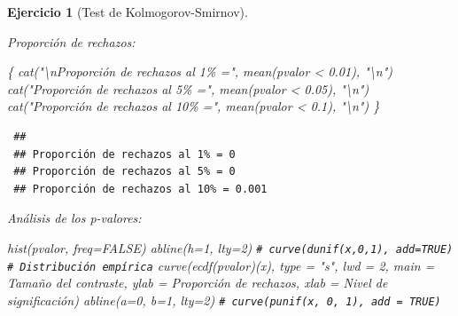 \documentclass[
]{book}
\newenvironment{Shaded}{\begin{snugshade}}{\end{snugshade}}
\newcommand{\AttributeTok}[1]{\textcolor[rgb]{0.77,0.63,0.00}{#1}}
\newcommand{\CommentTok}[1]{\textcolor[rgb]{0.56,0.35,0.01}{\textit{#1}}}
\newcommand{\ConstantTok}[1]{\textcolor[rgb]{0.00,0.00,0.00}{#1}}
\newcommand{\DecValTok}[1]{\textcolor[rgb]{0.00,0.00,0.81}{#1}}
\newcommand{\FloatTok}[1]{\textcolor[rgb]{0.00,0.00,0.81}{#1}}
\newcommand{\FunctionTok}[1]{\textcolor[rgb]{0.00,0.00,0.00}{#1}}
\newcommand{\NormalTok}[1]{#1}
\newcommand{\SpecialCharTok}[1]{\textcolor[rgb]{0.00,0.00,0.00}{#1}}
\newcommand{\StringTok}[1]{\textcolor[rgb]{0.31,0.60,0.02}{#1}}
\theoremstyle{break}
\newtheorem{exercise}{Ejercicio}[chapter]
\theoremstyle{nonumberplain}
\renewcommand{\CommentTok}[1]{\textcolor[rgb]{0.41,0.41,0.41}{\texttt{#1}}}
\begin{document}
\begin{exercise}[Test de Kolmogorov-Smirnov]
\begin{enumerate}
  Proporción de rechazos:

\begin{Shaded}
\begin{Highlighting}[]
\NormalTok{\{}
  \FunctionTok{cat}\NormalTok{(}\StringTok{"}\SpecialCharTok{\textbackslash{}n}\StringTok{Proporción de rechazos al 1\% ="}\NormalTok{, }\FunctionTok{mean}\NormalTok{(pvalor }\SpecialCharTok{\textless{}} \FloatTok{0.01}\NormalTok{), }\StringTok{"}\SpecialCharTok{\textbackslash{}n}\StringTok{"}\NormalTok{)}
  \FunctionTok{cat}\NormalTok{(}\StringTok{"Proporción de rechazos al 5\% ="}\NormalTok{, }\FunctionTok{mean}\NormalTok{(pvalor }\SpecialCharTok{\textless{}} \FloatTok{0.05}\NormalTok{), }\StringTok{"}\SpecialCharTok{\textbackslash{}n}\StringTok{"}\NormalTok{)}
  \FunctionTok{cat}\NormalTok{(}\StringTok{"Proporción de rechazos al 10\% ="}\NormalTok{, }\FunctionTok{mean}\NormalTok{(pvalor }\SpecialCharTok{\textless{}} \FloatTok{0.1}\NormalTok{), }\StringTok{"}\SpecialCharTok{\textbackslash{}n}\StringTok{"}\NormalTok{)}
\NormalTok{\}}
\end{Highlighting}
\end{Shaded}

\begin{verbatim}
 ## 
 ## Proporción de rechazos al 1% = 0 
 ## Proporción de rechazos al 5% = 0 
 ## Proporción de rechazos al 10% = 0.001
\end{verbatim}

  Análisis de los p-valores:

\begin{Shaded}
\begin{Highlighting}[]
\FunctionTok{hist}\NormalTok{(pvalor, }\AttributeTok{freq=}\ConstantTok{FALSE}\NormalTok{)}
\FunctionTok{abline}\NormalTok{(}\AttributeTok{h=}\DecValTok{1}\NormalTok{, }\AttributeTok{lty=}\DecValTok{2}\NormalTok{)   }\CommentTok{\# curve(dunif(x,0,1), add=TRUE)}
\CommentTok{\# Distribución empírica}
\FunctionTok{curve}\NormalTok{(}\FunctionTok{ecdf}\NormalTok{(pvalor)(x), }\AttributeTok{type =} \StringTok{"s"}\NormalTok{, }\AttributeTok{lwd =} \DecValTok{2}\NormalTok{, }
      \AttributeTok{main =} \StringTok{\textquotesingle{}Tamaño del contraste\textquotesingle{}}\NormalTok{, }\AttributeTok{ylab =} \StringTok{\textquotesingle{}Proporción de rechazos\textquotesingle{}}\NormalTok{, }
      \AttributeTok{xlab =} \StringTok{\textquotesingle{}Nivel de significación\textquotesingle{}}\NormalTok{)}
\FunctionTok{abline}\NormalTok{(}\AttributeTok{a=}\DecValTok{0}\NormalTok{, }\AttributeTok{b=}\DecValTok{1}\NormalTok{, }\AttributeTok{lty=}\DecValTok{2}\NormalTok{)   }\CommentTok{\# curve(punif(x, 0, 1), add = TRUE)}
\end{Highlighting}
\end{Shaded}


\end{enumerate}
\end{exercise}
\end{document}

